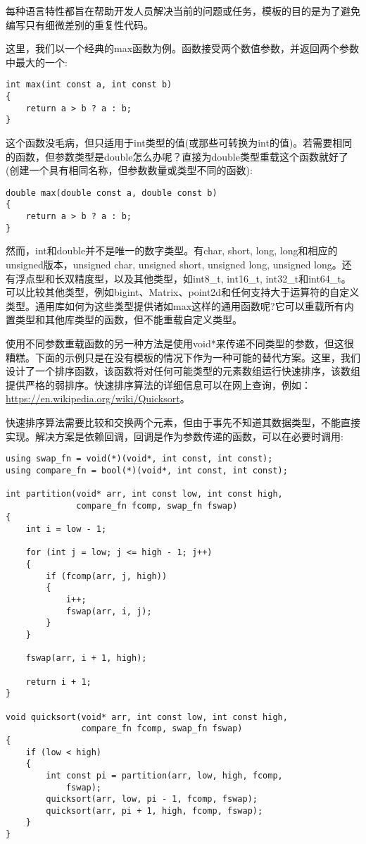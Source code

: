 每种语言特性都旨在帮助开发人员解决当前的问题或任务，模板的目的是为了避免编写只有细微差别的重复性代码。

这里，我们以一个经典的max函数为例。函数接受两个数值参数，并返回两个参数中最大的一个:

\begin{lstlisting}[style=styleCXX]
int max(int const a, int const b)
{
	return a > b ? a : b;
}
\end{lstlisting}

这个函数没毛病，但只适用于int类型的值(或那些可转换为int的值)。若需要相同的函数，但参数类型是double怎么办呢？直接为double类型重载这个函数就好了(创建一个具有相同名称，但参数数量或类型不同的函数):

\begin{lstlisting}[style=styleCXX]
double max(double const a, double const b)
{
	return a > b ? a : b;
}
\end{lstlisting}

然而，int和double并不是唯一的数字类型。有char, short, long, long和相应的unsigned版本，unsigned char, unsigned short, unsigned long, unsigned long。还有浮点型和长双精度型，以及其他类型，如int8\_t, int16\_t, int32\_t和int64\_t。可以比较其他类型，例如bigint、Matrix、point2d和任何支持大于运算符的自定义类型。通用库如何为这些类型提供诸如max这样的通用函数呢?它可以重载所有内置类型和其他库类型的函数，但不能重载自定义类型。

使用不同参数重载函数的另一种方法是使用void*来传递不同类型的参数，但这很糟糕。下面的示例只是在没有模板的情况下作为一种可能的替代方案。这里，我们设计了一个排序函数，该函数将对任何可能类型的元素数组运行快速排序，该数组提供严格的弱排序。快速排序算法的详细信息可以在网上查询，例如：\url{https://en.wikipedia.org/wiki/Quicksort}。

快速排序算法需要比较和交换两个元素，但由于事先不知道其数据类型，不能直接实现。解决方案是依赖回调，回调是作为参数传递的函数，可以在必要时调用:

\begin{lstlisting}[style=styleCXX]
using swap_fn = void(*)(void*, int const, int const);
using compare_fn = bool(*)(void*, int const, int const);

int partition(void* arr, int const low, int const high,
			  compare_fn fcomp, swap_fn fswap)
{
	int i = low - 1;
	
	for (int j = low; j <= high - 1; j++)
	{
		if (fcomp(arr, j, high))
		{
			i++;
			fswap(arr, i, j);
		}
	}

	fswap(arr, i + 1, high);
	
	return i + 1;
}

void quicksort(void* arr, int const low, int const high,
			   compare_fn fcomp, swap_fn fswap)
{
	if (low < high)
	{
		int const pi = partition(arr, low, high, fcomp,
			fswap);
		quicksort(arr, low, pi - 1, fcomp, fswap);
		quicksort(arr, pi + 1, high, fcomp, fswap);
	}
}
\end{lstlisting}

